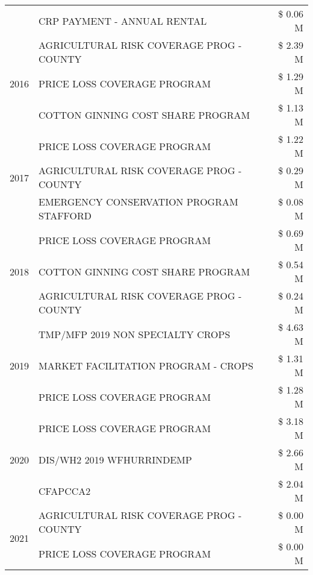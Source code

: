 \begin{tabular}{llr}
 & CRP PAYMENT - ANNUAL RENTAL & \$ 0.06 M \\
\cline{1-3}
\multirow[t]{3}{*}{2016} & AGRICULTURAL RISK COVERAGE PROG - COUNTY & \$ 2.39 M \\
 & PRICE LOSS COVERAGE PROGRAM & \$ 1.29 M \\
 & COTTON GINNING COST SHARE PROGRAM & \$ 1.13 M \\
\cline{1-3}
\multirow[t]{3}{*}{2017} & PRICE LOSS COVERAGE PROGRAM & \$ 1.22 M \\
 & AGRICULTURAL RISK COVERAGE PROG - COUNTY & \$ 0.29 M \\
 & EMERGENCY CONSERVATION PROGRAM STAFFORD & \$ 0.08 M \\
\cline{1-3}
\multirow[t]{3}{*}{2018} & PRICE LOSS COVERAGE PROGRAM & \$ 0.69 M \\
 & COTTON GINNING COST SHARE PROGRAM & \$ 0.54 M \\
 & AGRICULTURAL RISK COVERAGE PROG - COUNTY & \$ 0.24 M \\
\cline{1-3}
\multirow[t]{3}{*}{2019} & TMP/MFP 2019 NON SPECIALTY CROPS & \$ 4.63 M \\
 & MARKET FACILITATION PROGRAM - CROPS & \$ 1.31 M \\
 & PRICE LOSS COVERAGE PROGRAM & \$ 1.28 M \\
\cline{1-3}
\multirow[t]{3}{*}{2020} & PRICE LOSS COVERAGE PROGRAM & \$ 3.18 M \\
 & DIS/WH2 2019 WFHURRINDEMP & \$ 2.66 M \\
 & CFAPCCA2 & \$ 2.04 M \\
\cline{1-3}
\multirow[t]{2}{*}{2021} & AGRICULTURAL RISK COVERAGE PROG - COUNTY & \$ 0.00 M \\
 & PRICE LOSS COVERAGE PROGRAM & \$ 0.00 M \\
\cline{1-3}
\bottomrule
\end{tabular}
